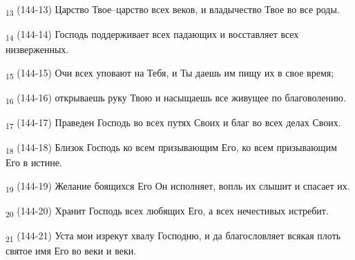 \begin{tcolorbox}
\textsubscript{13} (144-13) Царство Твое--царство всех веков, и владычество Твое во все роды.
\end{tcolorbox}
\begin{tcolorbox}
\textsubscript{14} (144-14) Господь поддерживает всех падающих и восставляет всех низверженных.
\end{tcolorbox}
\begin{tcolorbox}
\textsubscript{15} (144-15) Очи всех уповают на Тебя, и Ты даешь им пищу их в свое время;
\end{tcolorbox}
\begin{tcolorbox}
\textsubscript{16} (144-16) открываешь руку Твою и насыщаешь все живущее по благоволению.
\end{tcolorbox}
\begin{tcolorbox}
\textsubscript{17} (144-17) Праведен Господь во всех путях Своих и благ во всех делах Своих.
\end{tcolorbox}
\begin{tcolorbox}
\textsubscript{18} (144-18) Близок Господь ко всем призывающим Его, ко всем призывающим Его в истине.
\end{tcolorbox}
\begin{tcolorbox}
\textsubscript{19} (144-19) Желание боящихся Его Он исполняет, вопль их слышит и спасает их.
\end{tcolorbox}
\begin{tcolorbox}
\textsubscript{20} (144-20) Хранит Господь всех любящих Его, а всех нечестивых истребит.
\end{tcolorbox}
\begin{tcolorbox}
\textsubscript{21} (144-21) Уста мои изрекут хвалу Господню, и да благословляет всякая плоть святое имя Его во веки и веки.
\end{tcolorbox}
